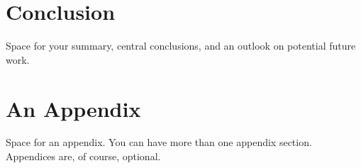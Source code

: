 \documentclass[a4paper,oneside,10pt,ngerman,english]{scrartcl}
\begin{document}
\cite{certad2022}
\cite{certad2023}
\cite{iamcv_paper}
\cite{its-vehicle}
\cite{certad2024irf}

\cite{certad2025swarco}
\cite{certad2025}

\cite{dora}
\cite{iamcv_dataset}
\cite{morales2022}
\cite{morales2023}
\cite{delre2025}



\section{Conclusion}
\label{sec:conclusion}

Space for your summary, central conclusions, and an outlook on potential future work.



\printbibliography

\appendix


\section{An Appendix}
\label{app:an-appendix}

Space for an appendix.
You can have more than one appendix section.
Appendices are, of course, optional.



\cleardoubleoddpage
\end{document}
